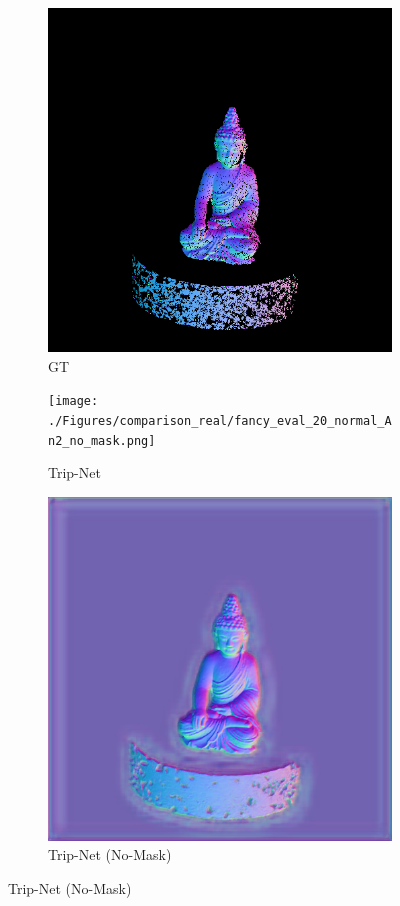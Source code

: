 \begin{figure}[th]
	\centering
	\captionsetup{width=\linewidth}
	\begin{subfigure}[b]{0.32\linewidth}
		\includegraphics[width=\linewidth]{./Figures/comparison_real/fancy_eval_20_groundtruth.png}
		\caption{GT}
	\end{subfigure}
	\begin{subfigure}[b]{0.32\linewidth}
	\texttt{[image: ./Figures/comparison\_real/fancy\_eval\_20\_normal\_An2\_no\_mask.png]}
	\caption{Trip-Net}
	\end{subfigure}
	\begin{subfigure}[b]{0.32\linewidth}
		\includegraphics[width=\linewidth]{./Figures/comparison_real/fancy_eval_20_normal_An2-real-resume-616.png}
		\caption{Trip-Net (No-Mask)}
	\end{subfigure}
	

\end{figure}
